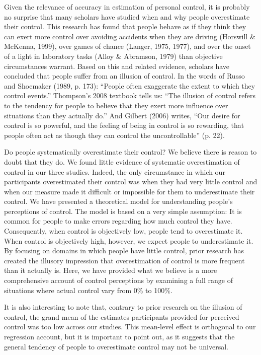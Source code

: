 \documentclass[USenglish,letterpaper,12pt,extrafontsizes,oneside,onecolumn,final]{memoir}
\begin{document}
Given the relevance of accuracy in estimation of personal control, it is probably no surprise that many scholars have studied when and why people overestimate their control. This research has found that people behave as if they think they can exert more control over avoiding accidents when they are driving (Horswill \& McKenna, 1999), over games of chance (Langer, 1975, 1977), and over the onset of a light in laboratory tasks (Alloy \& Abramson, 1979) than objective circumstances warrant. Based on this and related evidence, scholars have concluded that people suffer from an illusion of control. In the words of Russo and Shoemaker (1989, p. 173): ``People often exaggerate the extent to which they control events.'' Thompson's 2008 textbook tells us: ``The illusion of control refers to the tendency for people to believe that they exert more influence over situations than they actually do.'' And Gilbert (2006) writes, ``Our desire for control is so powerful, and the feeling of being in control is so rewarding, that people often act as though they can control the uncontrollable'' (p. 22).  

Do people systematically overestimate their control? We believe there is reason to doubt that they do. We found little evidence of systematic overestimation of control in our three studies. Indeed, the only circumstance in which our participants overestimated their control was when they had very little control and when our measure made it difficult or impossible for them to underestimate their control. We have presented a theoretical model for understanding people's perceptions of control. The model is based on a very simple assumption: It is common for people to make errors regarding how much control they have. Consequently, when control is objectively low, people tend to overestimate it. When control is objectively high, however, we expect people to underestimate it. By focusing on domains in which people have little control, prior research has created the illusory impression that overestimation of control is more frequent than it actually is. Here, we have provided what we believe is a more comprehensive account of control perceptions by examining a full range of situations where actual control vary from 0\% to 100\%.

It is also interesting to note that, contrary to prior research on the illusion of control, the grand mean of the estimates participants provided for perceived control was too low across our studies. This mean-level effect is orthogonal to our regression account, but it is important to point out, as it suggests that the general tendency of people to overestimate control may not be universal.
\end{document}
